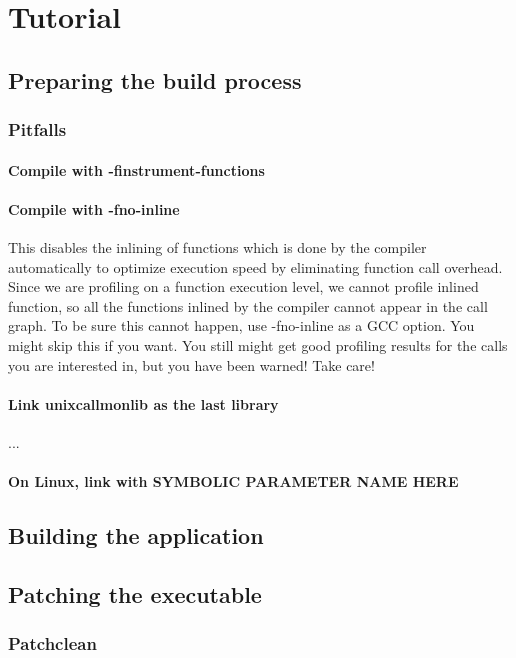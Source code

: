 \section{Tutorial}

\subsection{Preparing the build process} 
\subsubsection{Pitfalls}

\paragraph{Compile with -finstrument-functions} 
\paragraph{Compile with -fno-inline} This disables the inlining of functions which is done by the compiler automatically to optimize execution speed by eliminating function call overhead. Since we are profiling on a function execution level, we cannot profile inlined function, so all the functions inlined by the compiler cannot appear in the call graph. To be sure this cannot happen, use -fno-inline as a GCC option. You might skip this if you want. You still might get good profiling results for the calls you are interested in, but you have been warned! Take care!

\paragraph{Link unixcallmonlib as the last library} ...

\paragraph{On Linux, link with SYMBOLIC PARAMETER NAME HERE}

\subsection{Building the application}

\subsection{Patching the executable} 
\subsubsection{Patchclean} 

